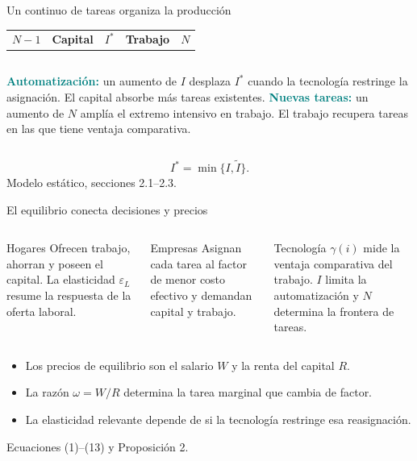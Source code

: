 \documentclass[aspectratio=169,11pt]{beamer}
\newcommand{\key}[1]{\textcolor{teal}{\textbf{#1}}}
\newcommand{\source}[1]{\vfill\hfill{\tiny\color{gray}#1}}
\begin{document}
\begin{frame}{Un continuo de tareas organiza la producción}
  \centering
  \begin{tabular}{p{}p{}p{}p{}p{}}
    \multicolumn{1}{c}{$N-1$} &
    \multicolumn{1}{c}{\cellcolor{navy!12}\textbf{Capital}} &
    \multicolumn{1}{c}{$I^{*}$} &
    \multicolumn{1}{c}{\cellcolor{teal!13}\textbf{Trabajo}} &
    \multicolumn{1}{c}{$N$} \\
  \end{tabular}
  \vspace{0.7cm}
  \begin{columns}[T,onlytextwidth]
      \key{Automatización:} un aumento de $I$ desplaza $I^{*}$ cuando la tecnología restringe la asignación.
      El capital absorbe más tareas existentes.
      \key{Nuevas tareas:} un aumento de $N$ amplía el extremo intensivo en trabajo.
      El trabajo recupera tareas en las que tiene ventaja comparativa.
  \end{columns}
  \vspace{0.55cm}
  \[
    I^{*}=\min\{I,\widetilde I\}.
  \]
  \source{Modelo estático, secciones 2.1--2.3.}
\end{frame}

\begin{frame}{El equilibrio conecta decisiones y precios}
  \begin{columns}[T,onlytextwidth]
      \begin{block}{Hogares}
        Ofrecen trabajo, ahorran y poseen el capital. La elasticidad $\varepsilon_L$ resume la respuesta de la oferta laboral.
      \end{block}
      \begin{block}{Empresas}
        Asignan cada tarea al factor de menor costo efectivo y demandan capital y trabajo.
      \end{block}
      \begin{block}{Tecnología}
        $\gamma(i)$ mide la ventaja comparativa del trabajo. $I$ limita la automatización y $N$ determina la frontera de tareas.
      \end{block}
  \end{columns}
  \vspace{0.45cm}
  \begin{itemize}
    \item Los precios de equilibrio son el salario $W$ y la renta del capital $R$.
    \item La razón $\omega=W/R$ determina la tarea marginal que cambia de factor.
    \item La elasticidad relevante depende de si la tecnología restringe esa reasignación.
  \end{itemize}
  \source{Ecuaciones (1)--(13) y Proposición 2.}
\end{frame}
\end{document}
